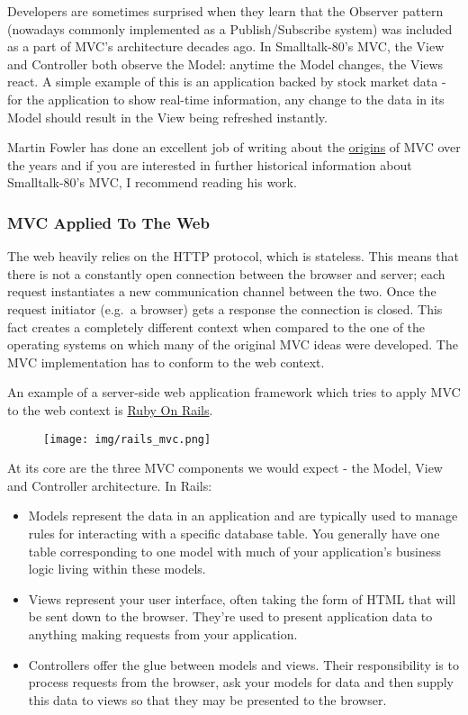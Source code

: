 \documentclass[9pt]{book}
\begin{document}
Developers are sometimes surprised when they learn that the Observer
pattern (nowadays commonly implemented as a Publish/Subscribe system)
was included as a part of MVC's architecture decades ago. In
Smalltalk-80's MVC, the View and Controller both observe the Model:
anytime the Model changes, the Views react. A simple example of this is
an application backed by stock market data - for the application to show
real-time information, any change to the data in its Model should result
in the View being refreshed instantly.

Martin Fowler has done an excellent job of writing about the
\href{http://martinfowler.com/eaaDev/uiArchs.html}{origins} of MVC over
the years and if you are interested in further historical information
about Smalltalk-80's MVC, I recommend reading his work.

\subsubsection{MVC Applied To The Web}\label{mvc-applied-to-the-web}

The web heavily relies on the HTTP protocol, which is stateless. This
means that there is not a constantly open connection between the browser
and server; each request instantiates a new communication channel
between the two. Once the request initiator (e.g.~a browser) gets a
response the connection is closed. This fact creates a completely
different context when compared to the one of the operating systems on
which many of the original MVC ideas were developed. The MVC
implementation has to conform to the web context.

An example of a server-side web application framework which tries to
apply MVC to the web context is
\href{http://guides.rubyonrails.org/}{Ruby On Rails}.

\begin{figure}[htbp]
\centering
\texttt{[image: img/rails\_mvc.png]}
\end{figure}

At its core are the three MVC components we would expect - the Model,
View and Controller architecture. In Rails:

\begin{itemize}
\itemsep1pt\parskip0pt
\item
  Models represent the data in an application and are typically used to
  manage rules for interacting with a specific database table. You
  generally have one table corresponding to one model with much of your
  application's business logic living within these models.
\item
  Views represent your user interface, often taking the form of HTML
  that will be sent down to the browser. They're used to present
  application data to anything making requests from your application.
\item
  Controllers offer the glue between models and views. Their
  responsibility is to process requests from the browser, ask your
  models for data and then supply this data to views so that they may be
  presented to the browser.
\end{itemize}
\end{document}
